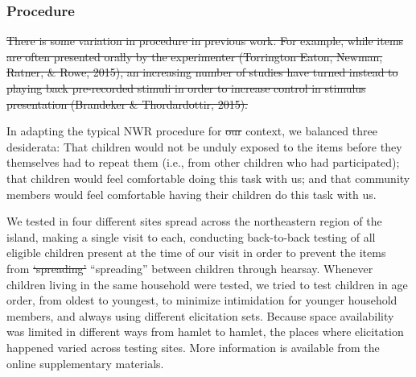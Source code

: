 \documentclass[english,,man,floatsintext]{apa6} %
\providecommand{\DIFaddtex}[1]{{\protect\color{blue}\uwave{#1}}} %
\providecommand{\DIFdeltex}[1]{{\protect\color{red}\sout{#1}}}                      %
\providecommand{\DIFaddbegin}{} %
\providecommand{\DIFaddend}{} %
\providecommand{\DIFdelbegin}{} %
\providecommand{\DIFdelend}{} %
\providecommand{\DIFadd}[1]{\texorpdfstring{\DIFaddtex{#1}}{#1}} %
\providecommand{\DIFdel}[1]{\texorpdfstring{\DIFdeltex{#1}}{}} %
\newcommand{\DIFscaledelfig}{0.5}
\newlength{\DIFdelgraphicswidth} %
\newlength{\DIFdelgraphicsheight} %
\newcommand{\DIFaddincludegraphics}[2][]{{\color{blue}\fbox{\DIFOincludegraphics[#1]{#2}}}} %
\newcommand{\DIFdelincludegraphics}[2][]{%
	\sbox{\DIFdelgraphicsbox}{\DIFOincludegraphics[#1]{#2}}%
	\settoboxwidth{\DIFdelgraphicswidth}{\DIFdelgraphicsbox} %
	\settoboxtotalheight{\DIFdelgraphicsheight}{\DIFdelgraphicsbox} %
	\scalebox{\DIFscaledelfig}{%
		\parbox[b]{\DIFdelgraphicswidth}{\usebox{\DIFdelgraphicsbox}\\[-\baselineskip] \rule{\DIFdelgraphicswidth}{0em}}\llap{\resizebox{\DIFdelgraphicswidth}{\DIFdelgraphicsheight}{%
				\setlength{\unitlength}{\DIFdelgraphicswidth}%
				\begin{picture}(1,1)%
				\thicklines\linethickness{2pt} %
				{\color[rgb]{1,0,0}\put(0,0){\framebox(1,1){}}}%
				{\color[rgb]{1,0,0}\put(0,0){\line( 1,1){1}}}%
				{\color[rgb]{1,0,0}\put(0,1){\line(1,-1){1}}}%
				\end{picture}%
			}\hspace*{3pt}}} %
} %
\DeclareRobustCommand{\DIFaddbegin}{\DIFOaddbegin \let\includegraphics\DIFaddincludegraphics} %
\DeclareRobustCommand{\DIFaddend}{\DIFOaddend \let\includegraphics\DIFOincludegraphics} %
\DeclareRobustCommand{\DIFdelbegin}{\DIFOdelbegin \let\includegraphics\DIFdelincludegraphics} %
\DeclareRobustCommand{\DIFdelend}{\DIFOaddend \let\includegraphics\DIFOincludegraphics} %
\begin{document}
\hypertarget{procedure}{%
	\subsubsection{Procedure}\label{procedure}}

\DIFdelbegin \DIFdel{There is some variation in procedure in previous work. For example, while items are often presented orally by the experimenter (Torrington Eaton, Newman, Ratner, \& Rowe, 2015), an increasing number of studies have turned instead to playing back pre-recorded stimuli in order to increase control in stimulus presentation (Brandeker \& Thordardottir, 2015).
}%

\DIFdelend In adapting the typical NWR procedure for \DIFdelbegin \DIFdel{our }\DIFdelend \DIFaddbegin \DIFadd{this }\DIFaddend context, we balanced three desiderata: That children would not be unduly exposed to the items before they themselves had to repeat them (i.e., from other children who had participated); that children would feel comfortable doing this task with us; and that community members would feel comfortable having their children do this task with us.

We tested in four different sites spread across the northeastern region of the island, making a single visit to each, conducting back-to-back testing of all eligible children present at the time of our visit in order to prevent the items from \DIFdelbegin \DIFdel{`spreading' }\DIFdelend \DIFaddbegin \enquote{spreading} \DIFaddend between children through hearsay. Whenever children living in the same household were tested, we tried to test children in age order, from oldest to youngest, to minimize intimidation for younger household members, and always using different elicitation sets. Because space availability was limited in different ways from hamlet to hamlet, the places where elicitation happened varied across testing sites. More information is available from the online supplementary materials.
\end{document}
